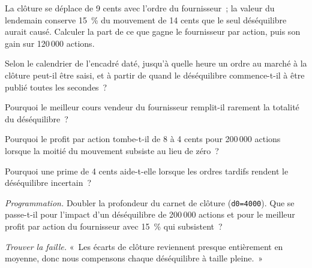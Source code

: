 \begin{exercise}[$\star$]\label{exo:hf:auctions-and-the-close:2}
La clôture se déplace de 9 cents avec l'ordre du fournisseur~; la valeur du lendemain conserve 15~\% du mouvement de 14 cents que le seul déséquilibre aurait causé.
Calculer la part de ce que gagne le fournisseur par action, puis son gain sur 120\,000 actions.
\end{exercise}

\begin{exercise}[$\star$]\label{exo:hf:auctions-and-the-close:3}
Selon le calendrier de l'encadré daté, jusqu'à quelle heure un ordre au marché à la clôture peut-il être saisi, et à partir de quand le déséquilibre commence-t-il à être publié toutes les secondes~?
\end{exercise}

\begin{exercise}[$\star\star$]\label{exo:hf:auctions-and-the-close:4}
Pourquoi le meilleur cours vendeur du fournisseur remplit-il rarement la totalité du déséquilibre~?
\end{exercise}

\begin{exercise}[$\star\star$]\label{exo:hf:auctions-and-the-close:5}
Pourquoi le profit par action tombe-t-il de 8 à 4 cents pour 200\,000 actions lorsque la moitié du mouvement subsiste au lieu de zéro~?
\end{exercise}

\begin{exercise}[$\star\star$]\label{exo:hf:auctions-and-the-close:6}
Pourquoi une prime de 4 cents aide-t-elle lorsque les ordres tardifs rendent le déséquilibre incertain~?
\end{exercise}

\begin{exercise}[$\star\star\star$]\label{exo:hf:auctions-and-the-close:7}
\emph{Programmation.} Doubler la profondeur du carnet de clôture (\texttt{d0=4000}). Que se passe-t-il pour l'impact d'un déséquilibre de 200\,000 actions et pour le
meilleur profit par action du fournisseur avec 15~\% qui subsistent~?
\end{exercise}

\begin{exercise}[$\star\star\star$]\label{exo:hf:auctions-and-the-close:8}
\emph{Trouver la faille.} «~Les écarts de clôture reviennent presque entièrement en moyenne, donc nous compensons chaque déséquilibre à taille pleine.~»
\end{exercise}

